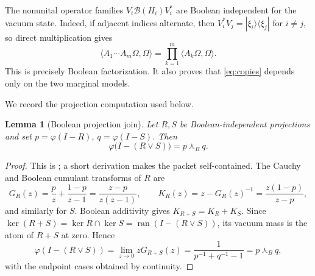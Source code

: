 \documentclass[11pt]{article}
\newtheorem{lemma}[theorem]{Lemma}
\newcommand{\Bmeet}{\mathbin{\curlywedge_{\!B}}}
\begin{document}
The nonunital operator families $V_i\mathcal B(H_i)V_i^*$ are Boolean
independent for the vacuum state.  Indeed, if adjacent indices alternate,
then $V_i^*V_j=|\xi_i\rangle\langle\xi_j|$ for $i\ne j$, so direct
multiplication gives
\[
 \langle A_1\cdots A_m\Omega,\Omega\rangle
 =\prod_{k=1}^m\langle A_k\Omega,\Omega\rangle.
\]
This is precisely Boolean factorization.  It also proves that
\eqref{eq:copies} depends only on the two marginal models.

We record the projection computation used below.

\begin{lemma}[Boolean projection join]\label{lem:proj}
Let $R,S$ be Boolean-independent projections and set
$p=\varphi(I-R)$, $q=\varphi(I-S)$.  Then
\[
 \varphi\bigl(I-(R\vee S)\bigr)=p\Bmeet q.
\]
\end{lemma}

\begin{proof}
This is \cite[Lemma 3.1]{VV2018}; a short derivation makes the packet
self-contained.  The Cauchy and Boolean cumulant transforms of $R$ are
\[
G_R(z)=\frac pz+\frac{1-p}{z-1}=\frac{z-p}{z(z-1)},
\qquad K_R(z)=z-G_R(z)^{-1}=\frac{z(1-p)}{z-p},
\]
and similarly for $S$.  Boolean additivity gives
$K_{R+S}=K_R+K_S$.  Since
$\ker(R+S)=\ker R\cap\ker S=\operatorname{ran}(I-(R\vee S))$, its vacuum
mass is the atom of $R+S$ at zero.  Hence
\[
\varphi(I-(R\vee S))
=\lim_{z\to0}zG_{R+S}(z)
=\frac1{p^{-1}+q^{-1}-1}=p\Bmeet q,
\]
with the endpoint cases obtained by continuity.
\end{proof}
\end{document}

